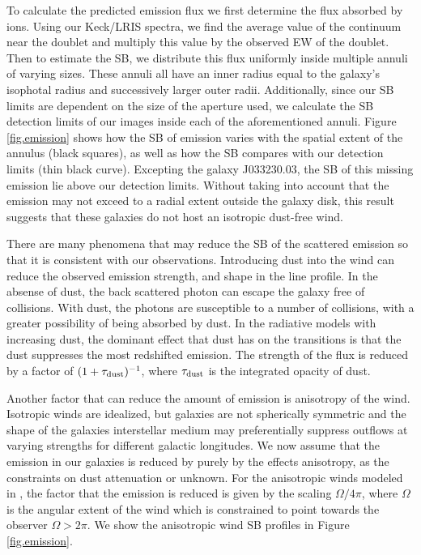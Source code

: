 \documentclass[twocolumn]{aastex61}
\begin{document}
To calculate the predicted emission flux we first determine the flux absorbed by  ions. Using our Keck/LRIS spectra, we find the average value of the continuum near the  doublet and multiply this value by the observed EW of the doublet. Then to estimate the SB, we distribute this flux uniformly inside multiple annuli of varying sizes. These annuli all have an inner radius equal to the galaxy's isophotal radius and successively larger outer radii.  Additionally, since our SB limits are dependent on the size of the aperture used, we calculate the SB detection limits of our images inside each of the aforementioned annuli. Figure \ref{fig.emission} shows how the SB of emission varies with the spatial extent of the annulus (black squares), as well as how the SB compares with our detection limits (thin black curve). Excepting the galaxy J033230.03, the SB of this missing emission lie above our detection limits. Without taking into account that the emission may not exceed to a radial extent outside the galaxy disk, this result suggests that these galaxies do not host an isotropic dust-free wind.

There are many phenomena that may reduce the SB of the scattered  emission so that it is consistent with our observations. Introducing dust into the wind can reduce the observed emission strength, and shape in the line profile. In the absense of dust, the back scattered  photon can escape the galaxy free of collisions. With dust, the photons are susceptible to a number of collisions, with a greater possibility of being absorbed by dust. In the \cite{Prochaska_2011} radiative models with increasing dust, the dominant effect that dust has on the  transitions is that the dust suppresses the most redshifted emission. The strength of the flux is reduced by a factor of $(1+\tau_{\rm{dust}})^{-1}$, where $\tau_{\rm{dust}}$ is the integrated opacity of dust.

Another factor that can reduce the amount of emission is anisotropy of the wind. Isotropic winds are idealized, but galaxies are not spherically symmetric and the shape of the galaxies interstellar medium may preferentially suppress outflows at varying strengths for different galactic longitudes. We now assume that the emission in our galaxies is reduced by purely by the effects anisotropy, as the constraints on dust attenuation or unknown. For the anisotropic winds modeled in \cite{Prochaska_2011}, the factor that the emission is reduced is given by the scaling $\Omega/4\pi$, where $\Omega$ is the angular extent of the wind which is constrained to point towards the observer $\Omega > 2\pi$. We show the anisotropic wind SB profiles in Figure  \ref{fig.emission}.
\end{document}
